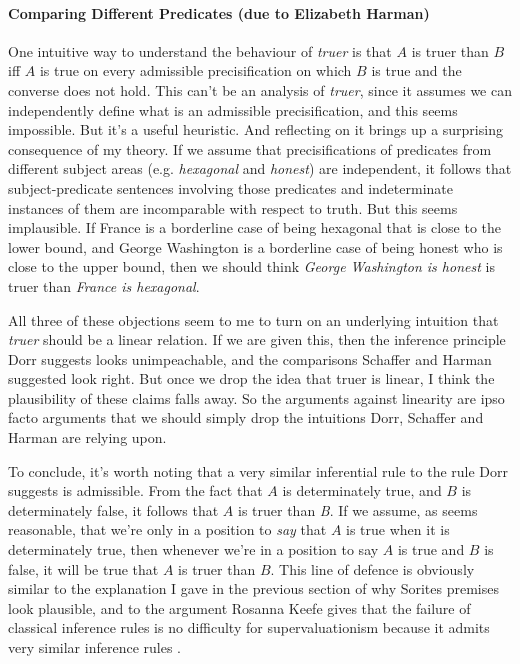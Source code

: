 \hypertarget{comparing-different-predicates-due-to-elizabeth-harman}{%
\paragraph*{Comparing Different Predicates (due to Elizabeth
Harman)}\label{comparing-different-predicates-due-to-elizabeth-harman}}

One intuitive way to understand the behaviour of \emph{truer} is that
\(A\) is truer than \(B\) iff \(A\) is true on every admissible
precisification on which \(B\) is true and the converse does not hold.
This can't be an analysis of \emph{truer}, since it assumes we can
independently define what is an admissible precisification, and this
seems impossible. But it's a useful heuristic. And reflecting on it
brings up a surprising consequence of my theory. If we assume that
precisifications of predicates from different subject areas (e.g.
\emph{hexagonal} and \emph{honest}) \emph{} are independent, it follows
that subject-predicate sentences involving those predicates and
indeterminate instances of them are incomparable with respect to truth.
But this seems implausible. If France is a borderline case of being
hexagonal that is close to the lower bound, and George Washington is a
borderline case of being honest who is close to the upper bound, then we
should think \emph{George Washington is honest} is truer than
\emph{France is hexagonal}.

All three of these objections seem to me to turn on an underlying
intuition that \emph{truer} should be a linear relation. If we are given
this, then the inference principle Dorr suggests looks unimpeachable,
and the comparisons Schaffer and Harman suggested look right. But once
we drop the idea that truer is linear, I think the plausibility of these
claims falls away. So the arguments against linearity are ipso facto
arguments that we should simply drop the intuitions Dorr, Schaffer and
Harman are relying upon.

To conclude, it's worth noting that a very similar inferential rule to
the rule Dorr suggests is admissible. From the fact that \(A\) is
determinately true, and \(B\) is determinately false, it follows that
\(A\) is truer than \emph{B}. If we assume, as seems reasonable, that
we're only in a position to \emph{say} that \(A\) is true when it is
determinately true, then whenever we're in a position to say \(A\) is
true and \(B\) is false, it will be true that \(A\) is truer than \(B\).
This line of defence is obviously similar to the explanation I gave in
the previous section of why Sorites premises look plausible, and to the
argument Rosanna Keefe gives that the failure of classical inference
rules is no difficulty for supervaluationism because it admits very
similar inference rules \citep{Keefe2000}.
